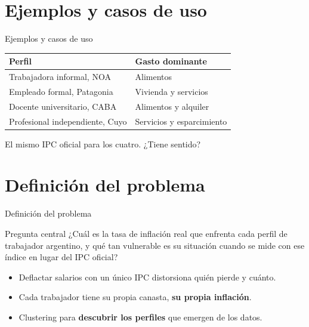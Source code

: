 \documentclass{beamer}
\begin{document}
\section{Ejemplos y casos de uso}
\begin{frame}{Ejemplos y casos de uso}

    \begin{table}
        \centering
        \small
        \begin{tabular}{ll}
            \hline
            \textbf{Perfil} & \textbf{Gasto dominante}\\
            \hline
            Trabajadora informal, NOA & Alimentos\\
            Empleado formal, Patagonia & Vivienda y servicios\\
            Docente universitario, CABA & Alimentos y alquiler\\
            Profesional independiente, Cuyo & Servicios y esparcimiento\\
            \hline
        \end{tabular}
    \end{table}

    \vspace{0.5em}
    \begin{block}{}
        El mismo IPC oficial para los cuatro. ¿Tiene sentido?
    \end{block}

\end{frame}

\section{Definición del problema}
\begin{frame}{Definición del problema}
    \begin{block}{Pregunta central}
        ¿Cuál es la tasa de inflación real que enfrenta cada perfil de trabajador argentino, y qué tan vulnerable es su situación cuando se mide con ese índice en lugar del IPC oficial?
    \end{block}
    \vspace{0.5em}
    \begin{itemize}
        \item Deflactar salarios con un único IPC distorsiona quién pierde y cuánto.
        \item Cada trabajador tiene su propia canasta, \textbf{su propia inflación}.
        \item Clustering para \textbf{descubrir los perfiles} que emergen de los datos.
    \end{itemize}
\end{frame}
\end{document}
